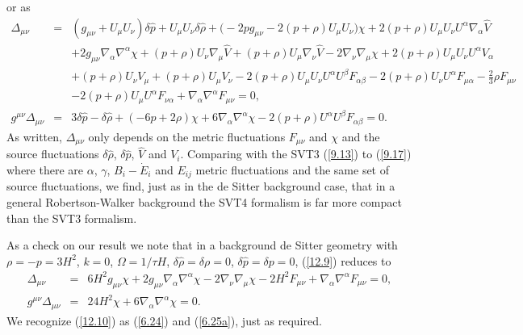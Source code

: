 \documentclass[aps,onecolumn,10pt]{revtex4}
\numberwithin{equation}{section}
\numberwithin{equation}{section}
\begin{document}
%
or as
%
%
\begin{eqnarray}
\Delta_{\mu\nu}&=& (g_{\mu \nu } + U_{\mu } U_{\nu }) \delta \hat{p}{} + U_{\mu } U_{\nu } \delta \hat{\rho}{} + \bigl(-2 p g_{\mu \nu } - 2 (p + \rho) U_{\mu } U_{\nu }\bigr) \chi + 2 (p + \rho) U_{\mu } U_{\nu } U^{\alpha } \nabla_{\alpha }\hat{V}{} 
\nonumber \\ 
&& + 2 g_{\mu \nu } \nabla_{\alpha }\nabla^{\alpha }\chi + (p + \rho) U_{\nu } \nabla_{\mu }\hat{V}{} + (p + \rho) U_{\mu } \nabla_{\nu }\hat{V}{} - 2 \nabla_{\nu }\nabla_{\mu }\chi +2 (p + \rho) U_{\mu } U_{\nu } U^{\alpha } V_{\alpha } \nonumber \\ 
&& + (p + \rho) U_{\nu } V_{\mu } + (p + \rho) U_{\mu } V_{\nu }-2 (p + \rho) U_{\mu } U_{\nu } U^{\alpha } U^{\beta } F_{\alpha \beta } - 2 (p + \rho) U_{\nu } U^{\alpha } F_{\mu \alpha } -  \tfrac{2}{3} \rho F_{\mu \nu } \nonumber \\ 
&& - 2 (p + \rho) U_{\mu } U^{\alpha } F_{\nu \alpha } + \nabla_{\alpha }\nabla^{\alpha }F_{\mu \nu }=0,
\nonumber\\ 
g^{\mu\nu}\Delta_{\mu\nu}&=& 3 \delta \hat{p}{} -  \delta \hat{\rho}{} + (-6 p + 2 \rho) \chi + 6 \nabla_{\alpha }\nabla^{\alpha }\chi -2 (p + \rho) U^{\alpha } U^{\beta } F_{\alpha \beta }=0.
\label{12.9}
\end{eqnarray}
%
As written, $\Delta_{\mu\nu}$ only depends on the metric fluctuations $F_{\mu\nu}$ and $\chi$  and  the source fluctuations $\delta \hat{\rho}$,  $\delta \hat{p}$, $\hat{V}$ and $V_i$. Comparing with the SVT3 (\ref{9.13}) to (\ref{9.17})  where there are $\alpha$, $\gamma$, $B_i-\dot{E}_i$ and $E_{ij}$ metric fluctuations and the same set of source fluctuations, we find, just as in the de Sitter background case, that  in a general Robertson-Walker background the SVT4 formalism is far more compact than the SVT3 formalism. 

As a check on our result we note that in a background de Sitter geometry with $\rho=-p=3H^2$, $k=0$, $\Omega=1/\tau H$, $\delta \hat{\rho}=\delta \rho=0$,  $\delta \hat{p}=\delta p=0$, (\ref{12.9}) reduces to 
%
\begin{eqnarray}
\Delta_{\mu\nu}&=& 6 H^2 g_{\mu \nu } \chi + 2 g_{\mu \nu } \nabla_{\alpha }\nabla^{\alpha }\chi - 2 \nabla_{\nu }\nabla_{\mu }\chi -2 H^2 F_{\mu \nu } + \nabla_{\alpha }\nabla^{\alpha }F_{\mu \nu }=0,
 \nonumber\\ 
g^{\mu\nu}\Delta_{\mu\nu}&=& 24 H^2 \chi + 6 \nabla_{\alpha }\nabla^{\alpha }\chi=0. 
\label{12.10}
\end{eqnarray}
%
We recognize (\ref{12.10}) as (\ref{6.24}) and (\ref{6.25a}), just as required.
\end{document}
